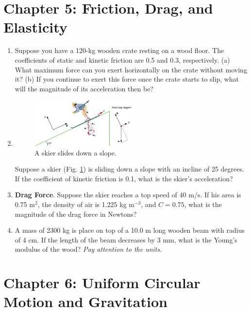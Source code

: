 \documentclass[10pt]{article}
\begin{document}
\clearpage

\section{Chapter 5: Friction, Drag, and Elasticity}

\begin{enumerate}
\item Suppose you have a 120-kg wooden crate resting on a wood floor. The coefficients of static and kinetic friction are 0.5 and 0.3, respectively.  (a) What maximum force can you exert horizontally on the crate without moving it? (b) If you continue to exert this force once the crate starts to slip, what will the magnitude of its acceleration then be? \\ \vspace{2.0cm}
\item 
\begin{figure}[ht]
\centering
\includegraphics[width=0.5\textwidth]{ski.png}
\caption{\label{fig:ski} A skier slides down a slope.}
\end{figure}
Suppose a skier (Fig. \ref{fig:ski}) is sliding down a slope with an incline of 25 degrees.  If the coefficient of kinetic friction is 0.1, what is the skier's acceleration? \\ \vspace{2.0cm}
\item \textbf{Drag Force}.  Suppose the skier reaches a top speed of 40 m/s.  If his area is 0.75 m$^2$, the density of air is 1.225 kg m$^{-3}$, and $C = 0.75$, what is the magnitude of the drag force in Newtons?  \\ \vspace{2cm}
\item A mass of 2300 kg is place on top of a 10.0 m long wooden beam with radius of 4 cm. If the length of the beam decreases by 3 mm, what is the Young's modulus of the wood? \textit{Pay attention to the units}.  \\ \vspace{2cm}
\end{enumerate}

\section{Chapter 6: Uniform Circular Motion and Gravitation}
\end{document}
